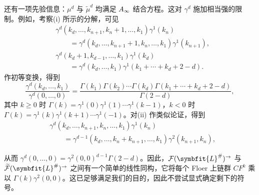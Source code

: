 还有一项先验信息：$\mu^d$ 与 $\tilde\mu^d$ 均满足 $A_\infty$ 结合方程。这对 $\gamma^d$ 施加相当强的限制。例如，考察(i) 所示的分解，可见
\[
\begin{aligned}
&\gamma^d(k_d,\ldots,k_{n+1},k_n+1,\ldots,k_1)\gamma^1(k_n)\\
&\qquad=\gamma^d(k_d,\ldots,k_{n+1}+1,k_n,\ldots,k_1)\gamma^1(k_{n+1}),\\
&\gamma^d(k_d+1,k_{d-1},\ldots,k_1)\gamma^1(k_d)\\
&\qquad=\gamma^d(k_d,\ldots,k_1)\gamma^1(k_1+\cdots+k_d+2-d).
\end{aligned}
\]
作初等变换，得到
\[
\frac{\gamma^d(k_d,\ldots,k_1)}{\gamma^d(0,\ldots,0)}
=\frac{\Gamma(k_1)\Gamma(k_2)\cdots\Gamma(k_d)\Gamma(k_1+\cdots+k_d+2-d)}{\Gamma(2-d)},
\]
其中 $k\geq0$ 时 $\Gamma(k)=\gamma^1(0)\gamma^1(1)\cdots\gamma^1(k-1)$，$k<0$ 时 $\Gamma(k)=\gamma^1(k)\gamma^1(k+1)\cdots\gamma^1(-1)$。对(ii) 作类似论证，得到
\[
\begin{aligned}
&\gamma^d(k_d,\ldots,k_{n+1},k_n,\ldots,k_1)\gamma^1(k_n)\\
&\qquad=\gamma^{d-1}(k_d,\ldots,k_n+k_{n+1},\ldots,k_1)\gamma^2(k_{n+1},k_n),
\end{aligned}
\]
{
从而 $\gamma^d(0,\allowbreak \ldots,\allowbreak 0)=\gamma^2(0,\allowbreak 0)^{d-1}\Gamma(2-d)$。因此，$\F(\symbfit{L}^\#)^\to$ 与 $\widetilde{\F}(\symbfit{L}^\#)^\to$ 之间有一个简单的线性同构，它将每个 Floer 上链群 $CF^k$ 乘以 $\Gamma(k)\gamma^2(0,\allowbreak 0)$。这已足够满足我们的目的，因此不尝试显式确定剩下的符号。\par}
